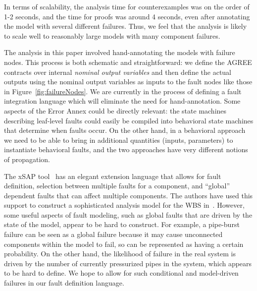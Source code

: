 In terms of scalability, the analysis time for counterexamples was on the order of 1-2 seconds, and the time for proofs was around 4 seconds, even after annotating the model with several different failures.  Thus, we feel that the analysis is likely to scale well to reasonably large models with many component failures.

The analysis in this paper involved hand-annotating the models with failure nodes.  This process is both schematic and straightforward: we define the AGREE contracts over internal {\em nominal output variables} and then define the actual outputs using the nominal output variables as inputs to the fault nodes like those in Figure~\ref{fig:failureNodes}.   We are currently in the process of defining a fault integration language which will eliminate the need for hand-annotation.  Some aspects of the Error Annex could be directly relevant: the state machines describing leaf-level faults could easily be compiled into behavioral state machines that determine when faults occur.  On the other hand, in a behavioral approach we need to be able to bring in additional quantities (inputs, parameters) to instantiate behavioral faults, and the two approaches have very different notions of propagation.

The xSAP tool~\cite{DBLP:conf/tacas/BittnerBCCGGMMZ16} has an elegant extension language that allows for fault definition, selection between multiple faults for a component, and ``global'' dependent faults that can affect multiple components.  The authors have used this support to construct a sophisticated analysis model for the WBS in~\cite{DBLP:conf/cav/BozzanoCPJKPRT15}.  However, some useful aspects of fault modeling, such as global faults that are driven by the state of the model, appear to be hard to construct.  For example, a pipe-burst failure can be seen as a global failure because it may cause unconnected components within the model to fail, so can be represented as having a certain probability.  On the other hand, the likelihood of failure in the real system is driven by the number of currently pressurized pipes in the system, which appears to be hard to define.  We hope to allow for such conditional and model-driven failures in our fault definition language.



